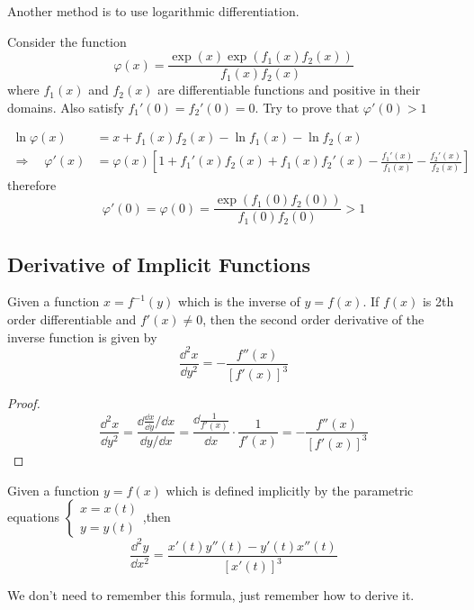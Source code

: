 \documentclass{overview}
\begin{document}
Another method is to use logarithmic differentiation.
\begin{example}
	Consider the function
	\[
		\varphi(x) = \frac{\exp(x)\exp(f_1(x)f_2(x))}{f_1(x)f_2(x)}
	\]
	where $f_1(x)$ and $f_2(x)$ are differentiable functions and positive in 
	their domains. Also satisfy $f_1'(0)=f_2'(0)=0$.
	Try to prove that $\varphi'(0) > 1$
	\begin{answer}
		\[
		\begin{aligned}
			\ln \varphi(x) &= x + f_1(x)f_2(x) - \ln f_1(x) - \ln f_2(x) \\
			\Rightarrow \quad \varphi'(x) &= \varphi(x) \left[ 1 +
			f_1'(x)f_2(x) + f_1(x)f_2'(x) - \frac{f_1'(x)}{f_1(x)} -
			\frac{f_2'(x)}{f_2(x)} \right]
		\end{aligned}
		\] 
		therefore
		\[
			\varphi'(0) = \varphi(0) = \frac{\exp(f_1(0)f_2(0))}{f_1(0)f_2(0)} > 1
		\]
	\end{answer}
\end{example}

\subsection{Derivative of Implicit Functions}

\begin{theorem}
	Given a function $x=f^{-1}(y)$ which is the inverse of $y=f(x)$. If $f(x)$ is
	2th order differentiable and $f'(x) \neq 0$, then the second order derivative of
	the inverse function is given by
	\[
		\frac{\dd^2 x}{\dd y^2} = -\frac{f''(x)}{[f'(x)]^3}
	\] 
	\begin{proof}
		\[
			\frac{\dd^2 x}{\dd y^2} = \frac{\dd \frac{\dd x}{\dd y} / \dd x}{\dd y / \dd x} =
			\frac{\dd \frac{1}{f'(x)}}{\dd x} \cdot \frac{1}{f'(x)} =
			-\frac{f''(x)}{[f'(x)]^3}
		\] 
	\end{proof}
\end{theorem}
\begin{theorem}
	Given a function $y=f(x)$ which is defined implicitly by the parametric equations
	$\begin{cases} x = x(t)\\ y = y(t)\end{cases}\!\!\!\!\!\!$,then 
	\[
		\frac{\dd^2 y}{\dd x^2} = \frac{x'(t)y''(t) - y'(t)x''(t)}{[x'(t)]^3}
	\] 
	\begin{remark}
		We don't need to remember this formula, just remember how to derive it.
	\end{remark}
\end{theorem}
\end{document}
